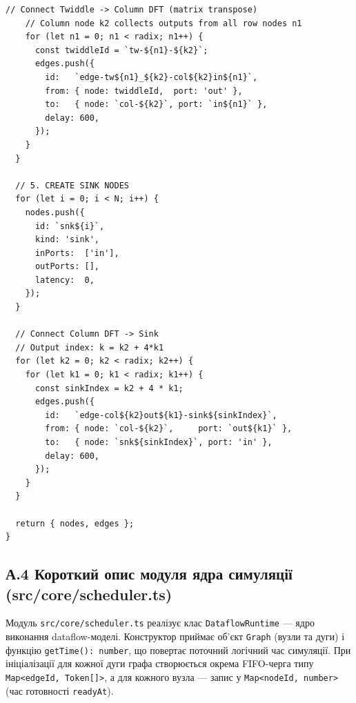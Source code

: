 \begin{lstlisting}[style=jsstyle,
  caption={Генерація DFG обчислювача 16-точкового ШПФ},
  label={lst:generate}]
    // Connect Twiddle -> Column DFT (matrix transpose)
    // Column node k2 collects outputs from all row nodes n1
    for (let n1 = 0; n1 < radix; n1++) {
      const twiddleId = `tw-${n1}-${k2}`;
      edges.push({
        id:   `edge-tw${n1}_${k2}-col${k2}in${n1}`,
        from: { node: twiddleId,  port: 'out' },
        to:   { node: `col-${k2}`, port: `in${n1}` },
        delay: 600,
      });
    }
  }

  // 5. CREATE SINK NODES
  for (let i = 0; i < N; i++) {
    nodes.push({
      id: `snk${i}`,
      kind: 'sink',
      inPorts:  ['in'],
      outPorts: [],
      latency:  0,
    });
  }

  // Connect Column DFT -> Sink
  // Output index: k = k2 + 4*k1
  for (let k2 = 0; k2 < radix; k2++) {
    for (let k1 = 0; k1 < radix; k1++) {
      const sinkIndex = k2 + 4 * k1;
      edges.push({
        id:   `edge-col${k2}out${k1}-sink${sinkIndex}`,
        from: { node: `col-${k2}`,     port: `out${k1}` },
        to:   { node: `snk${sinkIndex}`, port: 'in' },
        delay: 600,
      });
    }
  }

  return { nodes, edges };
}
\end{lstlisting}

\subsection*{А.4 Короткий опис модуля ядра симуляції (src/core/scheduler.ts)}

Модуль \texttt{src/core/scheduler.ts} реалізує клас \texttt{DataflowRuntime} ---
ядро виконання dataflow-моделі.
Конструктор приймає об'єкт \texttt{Graph} (вузли та дуги) і функцію
\texttt{getTime(): number}, що повертає поточний логічний час симуляції.
При ініціалізації для кожної дуги графа створюється окрема FIFO-черга
типу \texttt{Map<edgeId, Token[]>}, а для кожного вузла --- запис у
\texttt{Map<nodeId, number>} (час готовності \texttt{readyAt}).

